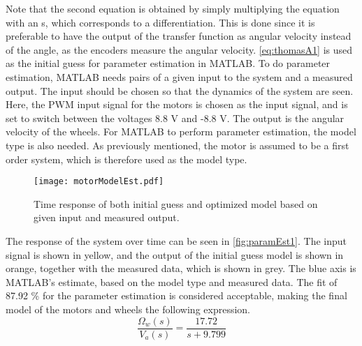 Note that the second equation is obtained by simply multiplying the equation with an s, which corresponds to a differentiation. This is done since it is preferable to have the output of the transfer function as angular velocity instead of the angle, as the encoders measure the angular velocity.
\autoref{eq:thomasA1} is used as the initial guess for parameter estimation in MATLAB. To do parameter estimation, MATLAB needs pairs of a given input to the system and a measured output. The input should be chosen so that the dynamics of the system are seen. Here, the PWM input signal for the motors is chosen as the input signal, and is set to switch between the voltages 8.8 V and -8.8 V. The output is the angular velocity of the wheels. For MATLAB to perform parameter estimation, the model type is also needed. As previously mentioned, the motor is assumed to be a first order system, which is therefore used as the model type.


\begin{figure}[H]
    \centering
    \texttt{[image: motorModelEst.pdf]}
    \caption{Time response of both initial guess and optimized model based on given input and measured output.}
    \label{fig:paramEst1}
\end{figure} 

The response of the system over time can be seen in \autoref{fig:paramEst1}. The input signal is shown in yellow, and the output of the initial guess model is shown in orange, together with the measured data, which is shown in grey. The blue axis is MATLAB's estimate, based on the model type and measured data. The fit of 87.92 \% for the parameter estimation is considered acceptable, making the final model of the motors and wheels the following expression.
\begin{equation}
\frac{\Omega_w(s)}{V_a(s)}=\frac{17.72}{s+9.799}
\end{equation}

